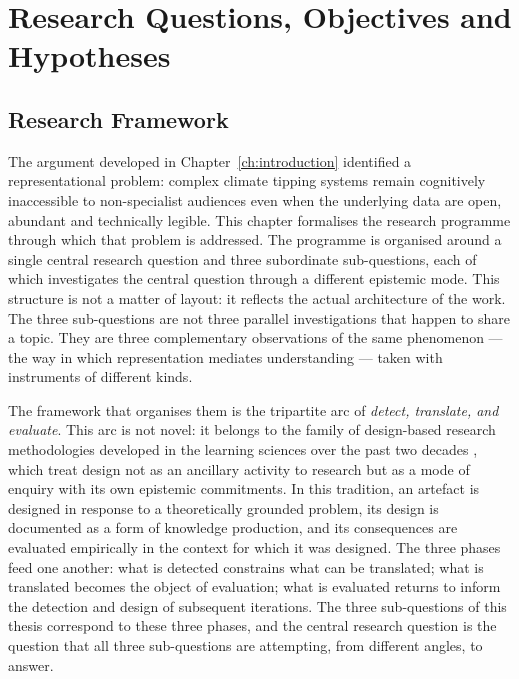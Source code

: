 
\chapter{Research Questions, Objectives and Hypotheses}
\label{ch:rqs}

\section{Research Framework}
\label{sec:rq-framework}

The argument developed in Chapter~\ref{ch:introduction} identified a representational problem: complex climate tipping systems remain cognitively inaccessible to non-specialist audiences even when the underlying data are open, abundant and technically legible. This chapter formalises the research programme through which that problem is addressed. The programme is organised around a single central research question and three subordinate sub-questions, each of which investigates the central question through a different epistemic mode. This structure is not a matter of layout: it reflects the actual architecture of the work. The three sub-questions are not three parallel investigations that happen to share a topic. They are three complementary observations of the same phenomenon --- the way in which representation mediates understanding --- taken with instruments of different kinds.

The framework that organises them is the tripartite arc of \emph{detect, translate, and evaluate}. This arc is not novel: it belongs to the family of design-based research methodologies developed in the learning sciences over the past two decades \citep{barab2004, andersonshattuck2012}, which treat design not as an ancillary activity to research but as a mode of enquiry with its own epistemic commitments. In this tradition, an artefact is designed in response to a theoretically grounded problem, its design is documented as a form of knowledge production, and its consequences are evaluated empirically in the context for which it was designed. The three phases feed one another: what is detected constrains what can be translated; what is translated becomes the object of evaluation; what is evaluated returns to inform the detection and design of subsequent iterations. The three sub-questions of this thesis correspond to these three phases, and the central research question is the question that all three sub-questions are attempting, from different angles, to answer.

